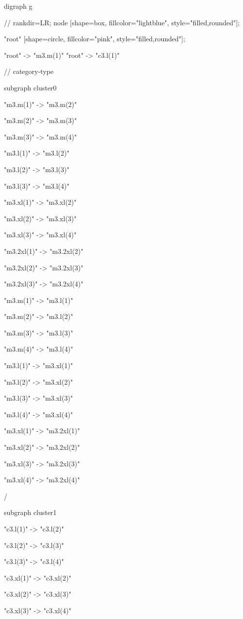 digraph g{
  // rankdir=LR;
  node [shape=box, fillcolor="lightblue", style="filled,rounded"];

  "root" [shape=circle, fillcolor="pink", style="filled,rounded"];
  
  "root" -> "m3.m(1)"
  "root" -> "c3.l(1)"
  
   
  // category-type
  
  subgraph cluster0 {
    "m3.m(1)" -> "m3.m(2)"

    "m3.m(2)" -> "m3.m(3)"

    "m3.m(3)" -> "m3.m(4)"
    
    "m3.l(1)" -> "m3.l(2)"

    "m3.l(2)" -> "m3.l(3)"

    "m3.l(3)" -> "m3.l(4)"
    
    "m3.xl(1)" -> "m3.xl(2)"

    "m3.xl(2)" -> "m3.xl(3)"

    "m3.xl(3)" -> "m3.xl(4)"
    
    "m3.2xl(1)" -> "m3.2xl(2)"

    "m3.2xl(2)" -> "m3.2xl(3)"

    "m3.2xl(3)" -> "m3.2xl(4)"
    
    "m3.m(1)" -> "m3.l(1)" 
  
  "m3.m(2)" -> "m3.l(2)"
  
  "m3.m(3)" -> "m3.l(3)"
  
  "m3.m(4)" -> "m3.l(4)"   

  "m3.l(1)" -> "m3.xl(1)" 
  
  "m3.l(2)" -> "m3.xl(2)"
  
  "m3.l(3)" -> "m3.xl(3)"
  
  "m3.l(4)" -> "m3.xl(4)"  

  "m3.xl(1)" -> "m3.2xl(1)" 
  
  "m3.xl(2)" -> "m3.2xl(2)"
  
  "m3.xl(3)" -> "m3.2xl(3)"
  
  "m3.xl(4)" -> "m3.2xl(4)"
    
  /}

  subgraph cluster1 {
     "c3.l(1)" -> "c3.l(2)"

    "c3.l(2)" -> "c3.l(3)"

    "c3.l(3)" -> "c3.l(4)"
    
    "c3.xl(1)" -> "c3.xl(2)"

    "c3.xl(2)" -> "c3.xl(3)"

    "c3.xl(3)" -> "c3.xl(4)"
    
}}
